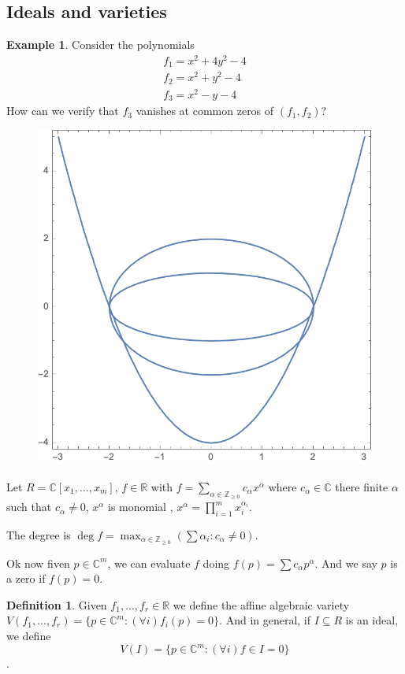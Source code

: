 \documentclass{article}
\theoremstyle{definition}
\newtheorem*{defn}{Definition}
\newtheorem{ex}{Example}
\newcommand{\R}{\mathbb{R}}
\newcommand{\Z}{\mathbb{Z}}
\newcommand{\C}{\mathbb{C}}
\begin{document}
\subsection{Ideals and varieties}
\begin{ex}
	Consider the polynomials
	\begin{align*}
		f_1=x^2+4y^2-4\\
		f_2=x^2+y^2-4\\
		f_3=x^2-y-4
	\end{align*}
	How can we verify that $f_3$ vanishes at common zeros of $(f_1,f_2)$?
	\begin{figure}[H]
		\centering
		\includegraphics[width=0.5\linewidth]{4}
		\caption*{}
		\label{fig:4}
	\end{figure}
	
\end{ex}
Let $R=\C[x_1,...,x_m]$, $f \in \R$ with $f=\sum_{\alpha\in\Z_{\geq0}}c_\alpha x^\alpha$ where $c_\alpha\in\C$ there finite $\alpha$ such that $c_\alpha\neq 0$, $x^\alpha$ is monomial , $x^\alpha=\prod_{i=1}^m x_i^{\alpha_i}.$\par 
The degree is $\deg f=\max_{\alpha\in\Z_{\geq0}}(\sum\alpha_i:c_\alpha\neq0)$.\par 
	
Ok now fiven $p\in\C^m$, we can evaluate $f$ doing $f(p)=\sum c_\alpha p^\alpha.$ And we say $p$ is a zero if $f(p)=0$.\par 
\begin{defn}
	Given $f_1,...,f_r\in\R$ we define the affine algebraic variety $V(f_1,...,f_r)=\{p\in\C^m:(\forall i)f_i(p)=0\}$. And in general, if $I\subseteq R$ is an ideal, we define $$V(I)=\{p\in\C^m:(\forall i)f\in I=0\}$$.
\end{defn}
\end{document}
